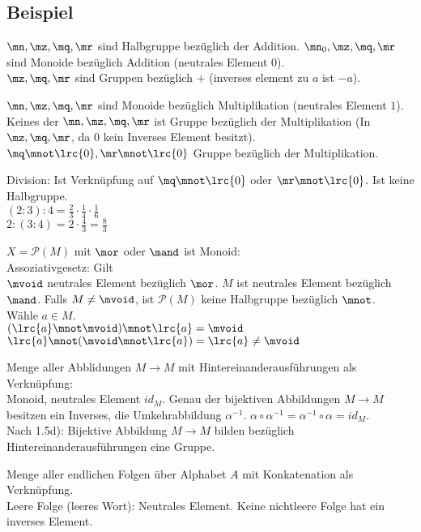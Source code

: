 	\subsection{Beispiel}
	
		\item $\mn,\mz,\mq,\mr$ sind Halbgruppe bezüglich der Addition. $\mn_0,\mz,\mq,\mr$ sind Monoide bezüglich Addition (neutrales Element $0$).\\
		$\mz,\mq,\mr$ sind Gruppen bezüglich $+$ (inverses element zu $a$ ist $-a$).
		\item $\mn,\mz,\mq,\mr$ sind Monoide bezüglich Multiplikation (neutrales Element $1$). Keines der $\mn,\mz,\mq,\mr$ ist Gruppe bezüglich der Multiplikation (In $\mz,\mq,\mr$, da $0$ kein Inverses Element besitzt). $\mq\mnot\lrc{0},\mr\mnot\lrc{0}$ Gruppe bezüglich der Multiplikation.
		\item Division: Ist Verknüpfung auf $\mq\mnot\lrc{0}$ oder $\mr\mnot\lrc{0}$. Ist keine Halbgruppe.\\
		$(2:3):4=\frac{2}{3}\cdot\frac{1}{4}\cdot\frac{1}{6}$\\
		$2:(3:4)=2\cdot\frac{4}{3}=\frac{8}{3}$
		\item $X=\mathcal{P}(M)$ mit $\mor$ oder $\mand$ ist Monoid:\\
		Assoziativgesetz: Gilt\\
		$\mvoid$ neutrales Element bezüglich $\mor$. $M$ ist neutrales Element bezüglich $\mand$. Falls $M\neq\mvoid$, ist $\mathcal{P}(M)$ keine Halbgruppe bezüglich $\mnot$.\\
		Wähle $a\in M$.\\
		$(\lrc{a}\mnot\mvoid)\mnot\lrc{a}=\mvoid$\\
		$\lrc{a}\mnot(\mvoid\mnot\lrc{a})=\lrc{a}\neq\mvoid$
		\item Menge aller Abblidungen $M\rightarrow M$ mit Hintereinanderausführungen als Verknüpfung:\\
		Monoid, neutrales Element $id_M$. Genau der bijektiven Abbildungen $M\rightarrow M$ besitzen ein Inverses, die Umkehrabbildung $\alpha^{-1}$. $\alpha\circ\alpha^{-1}=\alpha^{-1}\circ\alpha=id_M$.\\
		Nach 1.5d): Bijektive Abbildung $M\rightarrow M$ bilden bezüglich Hintereinanderausführungen eine Gruppe.
		\item Menge aller endlichen Folgen über Alphabet $A$ mit Konkatenation als Verknüpfung.\\
		Leere Folge (leeres Wort): Neutrales Element. Keine nichtleere Folge hat ein inverses Element.
